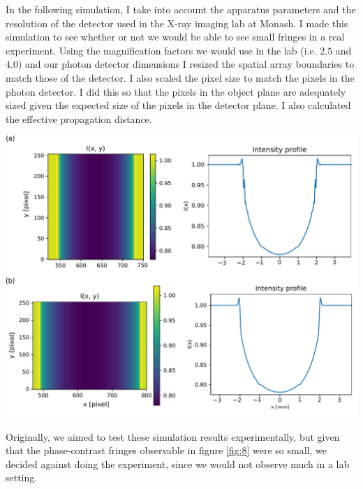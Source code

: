 \documentclass[10pt, a4paper, singlespacing]{report}
\newenvironment{Figure}
    {\par\medskip\noindent\minipage{\linewidth}}
    {\endminipage\par\medskip}
\begin{document}
In the following simulation, I take into account the apparatus parameters and the resolution of the detector used in the X-ray imaging lab at Monash. I made this simulation to see whether or not we would be able to see small fringes in a real experiment. Using the magnification factors we would use in the lab (i.e. $2.5$ and $4.0$) and our photon detector dimensions I resized the spatial array boundaries to match those of the detector. I also scaled the pixel size to match the pixels in the photon detector. I did this so that the pixels in the object plane are adequately sized given the expected size of the pixels in the detector plane. I also calculated the effective propagation distance.
\begin{Figure}
\centering
\includegraphics[width=\linewidth]{LAB_ice_water_AS_2_magnifications.pdf}
\label{fig:8}
\end{Figure}
Originally, we aimed to test these simulation results experimentally, but given that the phase-contrast fringes observable in figure \ref{fig:8} were so small, we decided against doing the experiment, since we would not observe much in a lab setting. 
\end{document}
